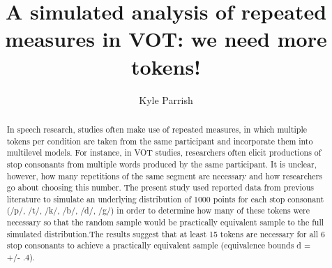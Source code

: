 \title{A simulated analysis of repeated measures in VOT: we need more tokens!}
\author{Kyle Parrish}


\maketitle

\begin{abstract}
In speech research, studies often make use of repeated measures, in which multiple tokens per condition are taken from the same participant and incorporate them into multilevel models. For instance, in VOT studies, researchers often elicit productions of stop consonants from multiple words produced by the same participant. It is unclear, however, how many repetitions of the same segment are necessary and how researchers go about choosing this number. The present study used reported data from previous literature to simulate an underlying distribution of 1000 points for each stop consonant (/p/, /t/, /k/, /b/, /d/, /g/) in order to determine how many of these tokens were necessary so that the random sample would be practically equivalent sample to the full simulated distribution.The results suggest that at least 15 tokens are necessary for all 6 stop consonants to achieve a practically equivalent sample (equivalence bounds d = +/- .4).
\end{abstract}


